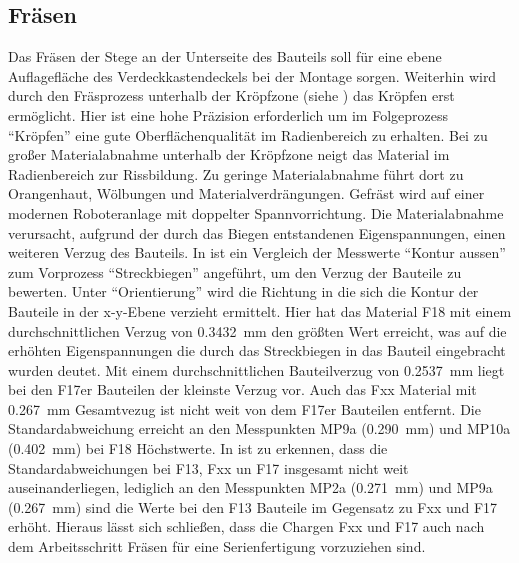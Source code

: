 \documentclass[12pt,a4paper,parskip,twoside,BCOR5mm,headsepline]{scrartcl}
\begin{document}
\subsection{Fräsen}
Das Fräsen der Stege an der Unterseite des Bauteils soll für eine ebene Auflagefläche des  Verdeckkastendeckels bei der Montage sorgen. Weiterhin wird durch den Fräsprozess unterhalb der Kröpfzone (siehe )  das Kröpfen erst ermöglicht. Hier ist eine hohe Präzision erforderlich um im Folgeprozess "`Kröpfen"' eine gute Oberflächenqualität im Radienbereich zu erhalten. Bei zu großer Materialabnahme unterhalb der Kröpfzone neigt das Material im Radienbereich zur Rissbildung. Zu geringe Materialabnahme führt dort zu Orangenhaut, Wölbungen und Materialverdrängungen. Gefräst wird auf einer modernen Roboteranlage mit doppelter Spannvorrichtung. Die Materialabnahme verursacht,  aufgrund der durch das Biegen entstandenen Eigenspannungen,  einen weiteren Verzug des Bauteils. In   ist ein Vergleich der Messwerte "`Kontur aussen"' zum Vorprozess "`Streckbiegen"' angeführt,  um den Verzug der Bauteile zu bewerten. Unter "`Orientierung"' wird die Richtung in die sich die Kontur der Bauteile in der x-y-Ebene verzieht ermittelt. Hier hat das Material F18 mit einem durchschnittlichen Verzug von \SI{0,3432}{\milli\meter} den größten Wert erreicht, was auf die erhöhten Eigenspannungen  die durch das Streckbiegen in das Bauteil eingebracht wurden deutet. Mit einem durchschnittlichen Bauteilverzug von \SI{0,2537}{\milli\meter} liegt bei den F17er Bauteilen der kleinste  Verzug vor. Auch das Fxx Material mit \SI{0,267}{\milli\meter} Gesamtvezug ist nicht weit von dem F17er Bauteilen entfernt. Die Standardabweichung erreicht an den Messpunkten MP9a (\SI{0,290}{\milli\meter}) und MP10a (\SI{0,402}{\milli\meter}) bei F18 Höchstwerte. In  ist zu erkennen, dass  die Standardabweichungen bei F13, Fxx un F17 insgesamt nicht weit auseinanderliegen, lediglich an den Messpunkten MP2a (\SI{0,271}{\milli\meter}) und MP9a (\SI{0,267}{\milli\meter}) sind die Werte bei den F13 Bauteile im Gegensatz zu Fxx und F17 erhöht. 
Hieraus lässt sich schließen, dass die Chargen Fxx und F17 auch nach dem Arbeitsschritt Fräsen für eine Serienfertigung vorzuziehen sind. 
\end{document}
